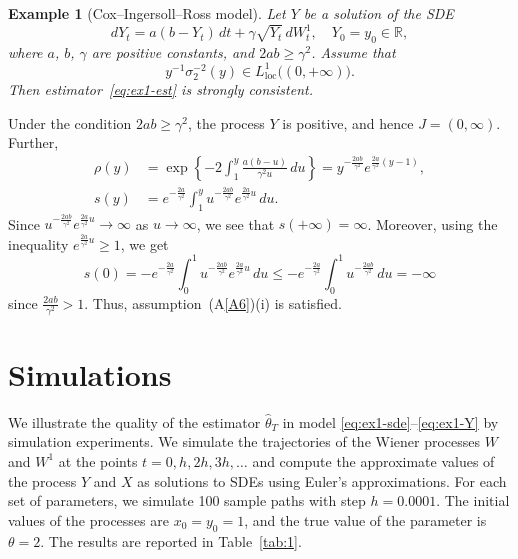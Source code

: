 \documentclass[numbers,compress,v1.0.1]{vmsta}
\newtheorem{example}{Example}
\theoremstyle{remark}
\newcommand{\R}{\mathbb R}
\newcommand*{\set}[1]{\left\{#1\right\}}
\newcommand{\lloc}{L^1_{\mathrm{loc}}}
\begin{document}
\begin{example}[Cox--Ingersoll--Ross model]
Let $Y$ be a solution of the SDE
%
\[
dY_t =a(b-Y_t)\,dt + \gamma\sqrt{Y_t}
\,dW_t^1, \quad Y_0=y_0\in\R,
\]
%
where $a$, $b$, $\gamma$ are positive constants, and $2ab\ge
\gamma^2$.
Assume that
%
\[
y^{-1}\sigma_2^{-2}(y)\in\lloc\bigl((0,+\infty)
\bigr).
\]
%
Then estimator~\eqref{eq:ex1-est} is strongly consistent.
\end{example}
%
Under the condition $2ab\ge\gamma^2$, the process $Y$ is positive, and
hence $J=(0,\infty)$. Further,
%
\begin{align*}
\rho(y)&=\exp\set{-2\int_1^y\frac{a(b-u)}{\gamma^2u}
\,du} %
=y^{-\frac{2ab}{\gamma^2}}e^{\frac{2a}{\gamma^2}(y-1)},
\\
s(y)&=e^{-\frac{2a}{\gamma^2}}\int_1^yu^{-\frac{2ab}{\gamma^2}}e^{\frac
{2a}{\gamma^2}u}
\,du.
\end{align*}
%
Since $u^{-\frac{2ab}{\gamma^2}}e^{\frac{2a}{\gamma^2}u}\to\infty$ as
$u\to\infty$, we see that $s(+\infty)=\infty$.
Moreover, using the inequality $e^{\frac{2a}{\gamma^2}u}\ge1$, we get
%
\[
s(0)=-e^{-\frac{2a}{\gamma^2}}\int_0^1u^{-\frac{2ab}{\gamma^2}}e^{\frac
{2a}{\gamma^2}u}
\,du \le-e^{-\frac{2a}{\gamma^2}}\int_0^1u^{-\frac{2ab}{\gamma^2}}
\,du =-\infty
\]
%
since $\frac{2ab}{\gamma^2}>1$.
Thus, assumption~(A\ref{A6})(i) is satisfied.

\section{Simulations}
\label{sec:4}
We illustrate the quality of the estimator $\hat\theta_T$ in model
\eqref{eq:ex1-sde}--\eqref{eq:ex1-Y} by simulation experiments.
We simulate the trajectories of the Wiener processes $W$ and $W^1$ at
the points
$t = 0, h, 2h, 3h,\dots$
and compute the approximate values of the process $Y$ and $X$ as
solutions to SDEs using Euler's approximations.
For each set of parameters, we simulate 100 sample paths with step $h = 0.0001$.
The initial values of the processes are $x_0=y_0=1$, and the true value
of the parameter is $\theta=2$.
The results are reported in Table~\ref{tab:1}.
\end{document}
